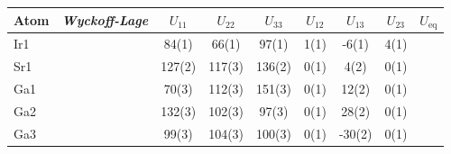 \begin{tabular}{lcS[table-format = -3(2)]S[table-format = -3(2)]S[table-format = -3(2)]S[table-format = -3(2)]S[table-format = -3(2)]S[table-format = -3(2)]S[table-format = -3(2)]}  
\toprule
Atom	&\textit{\textit{Wyckoff}-Lage}	& $U_{11}$	& $U_{22}$	& $U_{33}$	& $U_{12}$	 & $U_{13}$ & $U_{23}$	& $U_{\text{eq}}$ \\
\midrule
Ir1 &   & 84(1) & 66(1) & 97(1) & 1(1) & -6(1) & 4(1) \\
Sr1 &   & 127(2) & 117(3) & 136(2) & 0(1) & 4(2) & 0(1) \\
Ga1 &   & 70(3) & 112(3) & 151(3) & 0(1) & 12(2) & 0(1) \\
Ga2 &   & 132(3) & 102(3) & 97(3) & 0(1) & 28(2) & 0(1) \\
Ga3 &   & 99(3) & 104(3) & 100(3) & 0(1) & -30(2) & 0(1) \\
\bottomrule
\end{tabular}

